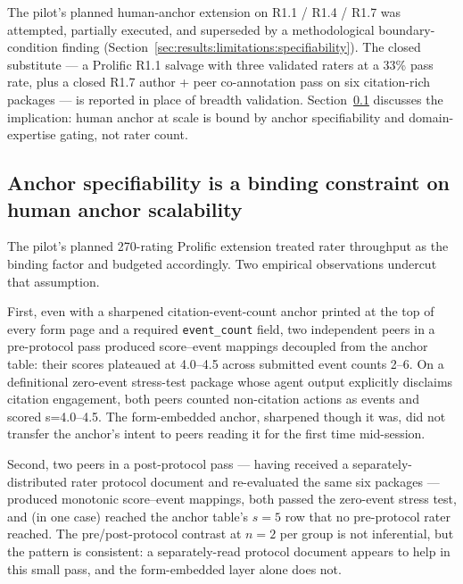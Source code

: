 The pilot's planned human-anchor extension on R1.1 / R1.4 / R1.7 was attempted, partially executed, and superseded by a methodological boundary-condition finding (Section~\ref{sec:results:limitations:specifiability}). The closed substitute --- a Prolific R1.1 salvage with three validated raters at a 33\% pass rate, plus a closed R1.7 author + peer co-annotation pass on six citation-rich packages --- is reported in place of breadth validation. Section~\ref{sec:discussion:specifiability} discusses the implication: human anchor at scale is bound by anchor specifiability and domain-expertise gating, not rater count.

\subsection{Anchor specifiability is a binding constraint on human anchor scalability}
\label{sec:discussion:specifiability}

The pilot's planned 270-rating Prolific extension treated rater throughput as the binding factor and budgeted accordingly. Two empirical observations undercut that assumption.

First, even with a sharpened citation-event-count anchor printed at the top of every form page and a required \texttt{event\_count} field, two independent peers in a pre-protocol pass produced score--event mappings decoupled from the anchor table: their scores plateaued at 4.0--4.5 across submitted event counts 2--6. On a definitional zero-event stress-test package whose agent output explicitly disclaims citation engagement, both peers counted non-citation actions as events and scored s=4.0--4.5. The form-embedded anchor, sharpened though it was, did not transfer the anchor's intent to peers reading it for the first time mid-session.

Second, two peers in a post-protocol pass --- having received a separately-distributed rater protocol document and re-evaluated the same six packages --- produced monotonic score--event mappings, both passed the zero-event stress test, and (in one case) reached the anchor table's $s = 5$ row that no pre-protocol rater reached. The pre/post-protocol contrast at $n = 2$ per group is not inferential, but the pattern is consistent: a separately-read protocol document appears to help in this small pass, and the form-embedded layer alone does not.


